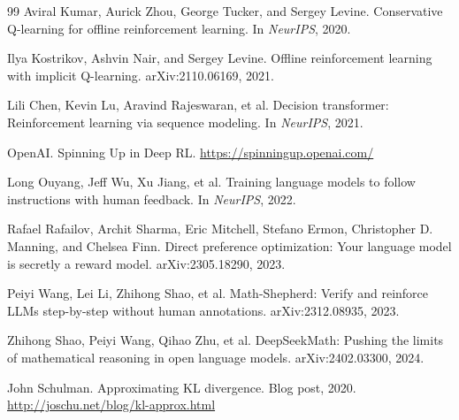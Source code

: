 \documentclass[11pt]{article}
\begin{document}
\begin{thebibliography}{99}
  Aviral Kumar, Aurick Zhou, George Tucker, and Sergey Levine.
  \newblock Conservative Q-learning for offline reinforcement learning.
  \newblock In \emph{NeurIPS}, 2020.

  Ilya Kostrikov, Ashvin Nair, and Sergey Levine.
  \newblock Offline reinforcement learning with implicit Q-learning.
  \newblock arXiv:2110.06169, 2021.

  Lili Chen, Kevin Lu, Aravind Rajeswaran, et al.
  \newblock Decision transformer: Reinforcement learning via sequence modeling.
  \newblock In \emph{NeurIPS}, 2021.

  OpenAI.
  \newblock Spinning Up in Deep RL.
  \newblock \url{https://spinningup.openai.com/}

  Long Ouyang, Jeff Wu, Xu Jiang, et al.
  \newblock Training language models to follow instructions with human feedback.
  \newblock In \emph{NeurIPS}, 2022.

  Rafael Rafailov, Archit Sharma, Eric Mitchell, Stefano Ermon, Christopher D. Manning, and Chelsea Finn.
  \newblock Direct preference optimization: Your language model is secretly a reward model.
  \newblock arXiv:2305.18290, 2023.

  Peiyi Wang, Lei Li, Zhihong Shao, et al.
  \newblock Math-Shepherd: Verify and reinforce LLMs step-by-step without human annotations.
  \newblock arXiv:2312.08935, 2023.

  Zhihong Shao, Peiyi Wang, Qihao Zhu, et al.
  \newblock DeepSeekMath: Pushing the limits of mathematical reasoning in open language models.
  \newblock arXiv:2402.03300, 2024.

  John Schulman.
  \newblock Approximating KL divergence.
  \newblock Blog post, 2020.
  \newblock \url{http://joschu.net/blog/kl-approx.html}

  \end{thebibliography}
\end{document}

